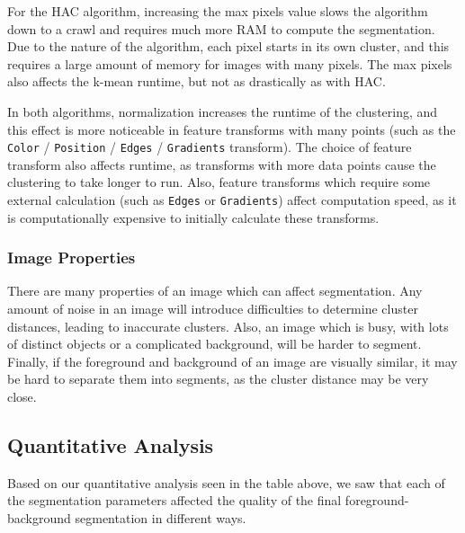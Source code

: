 \documentclass[12pt]{article}
\begin{document}
For the HAC algorithm, increasing the max pixels value slows the algorithm down to a crawl and requires much more RAM to compute the segmentation. Due to the nature of the algorithm, each pixel starts in its own cluster, and this requires a large amount of memory for images with many pixels. The max pixels also affects the k-mean runtime, but not as drastically as with HAC.

In both algorithms, normalization increases the runtime of the clustering, and this effect is more noticeable in feature transforms with many points (such as the \texttt{Color} / \texttt{Position} / \texttt{Edges} / \texttt{Gradients} transform). The choice of feature transform also affects runtime, as transforms with more data points cause the clustering to take longer to run. Also, feature transforms which require some external calculation (such as \texttt{Edges} or \texttt{Gradients}) affect computation speed, as it is computationally expensive to initially calculate these transforms.

\subsubsection{Image Properties}
	There are many properties of an image which can affect segmentation. Any amount of noise in an image will introduce difficulties to determine cluster distances, leading to inaccurate clusters. Also, an image which is busy, with lots of distinct objects or a complicated background, will be harder to segment. Finally, if the foreground and background of an image are visually similar, it may be hard to separate them into segments, as the cluster distance may be very close. 

\subsection{Quantitative Analysis}

Based on our quantitative analysis seen in the table above, we saw that each of the segmentation parameters affected the quality of the final foreground-background segmentation in different ways.
\end{document}
